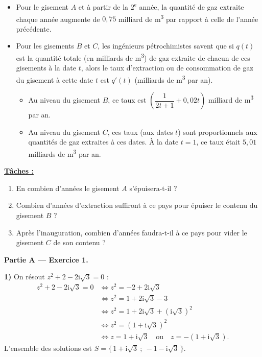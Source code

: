 \begin{itemize}
\item Pour le gisement $A$ et à partir de la $2^{\text{e}}$ année, la quantité de gaz extraite
  chaque année augmente de $0{,}75$ milliard de m\textsuperscript{3} par rapport à celle de l'année
  précédente.
\item Pour les gisements $B$ et $C$, les ingénieurs pétrochimistes savent que si $q(t)$ est la
  quantité totale (en milliards de m\textsuperscript{3}) de gaz extraite de chacun de ces gisements à la
  date $t$, alors le taux d'extraction ou de consommation de gaz du gisement à cette date $t$
  est $q'(t)$ (milliards de m\textsuperscript{3} par an).
  \begin{itemize}
  \item Au niveau du gisement $B$, ce taux est $\left(\dfrac{1}{2t+1}+0{,}02t\right)$ milliard de
    m\textsuperscript{3} par an.
  \item Au niveau du gisement $C$, ces taux (aux dates $t$) sont proportionnels aux quantités de
    gaz extraites à ces dates. À la date $t=1$, ce taux était $5{,}01$ milliards de m\textsuperscript{3} par an.
  \end{itemize}
\end{itemize}

\noindent\textbf{\underline{Tâches :}}
\begin{enumerate}[label=\textbf{\arabic*.},leftmargin=2.2em]
\item En combien d'années le gisement $A$ s'épuisera-t-il ?
\item Combien d'années d'extraction suffiront à ce pays pour épuiser le contenu du gisement $B$ ?
\item Après l'inauguration, combien d'années faudra-t-il à ce pays pour vider le gisement $C$ de
  son contenu ?
\end{enumerate}


\noindent\textbf{Partie A — Exercice 1.}

\smallskip
\noindent\textbf{1)} On résout $z^2+2-2\mathrm{i}\sqrt3=0$ :
\begin{align*}
z^2+2-2\mathrm{i}\sqrt3=0
&\iff z^2=-2+2\mathrm{i}\sqrt3\\
&\iff z^2=1+2\mathrm{i}\sqrt3-3\\
&\iff z^2=1+2\mathrm{i}\sqrt3+(\mathrm{i}\sqrt3)^2\\
&\iff z^2=(1+\mathrm{i}\sqrt3)^2\\
&\iff z=1+\mathrm{i}\sqrt3\quad\text{ou}\quad z=-(1+\mathrm{i}\sqrt3).
\end{align*}
L'ensemble des solutions est $S=\{\,1+\mathrm{i}\sqrt3\ ;\ -1-\mathrm{i}\sqrt3\,\}$.

